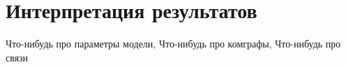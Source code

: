 \chapter{Интерпретация результатов} \label{analysis}
Что-нибудь про параметры модели,
Что-нибудь про комграфы,
Что-нибудь про связи
\clearpage
